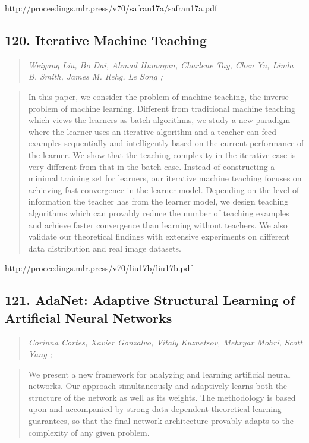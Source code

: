 \documentclass{article}
\begin{document}
\href{http://proceedings.mlr.press/v70/safran17a/safran17a.pdf}{http://proceedings.mlr.press/v70/safran17a/safran17a.pdf}

\subsection{120. Iterative Machine Teaching}

\begin{quote}
\footnotesize{\textit{Weiyang Liu, Bo Dai, Ahmad Humayun, Charlene Tay, Chen Yu, Linda B. Smith, James M. Rehg, Le Song ;}}

\end{quote}

\begin{quote}
    In this paper, we consider the problem of machine teaching, the inverse problem of machine learning. Different from traditional machine teaching which views the learners as batch algorithms, we study a new paradigm where the learner uses an iterative algorithm and a teacher can feed examples sequentially and intelligently based on the current performance of the learner. We show that the teaching complexity in the iterative case is very different from that in the batch case. Instead of constructing a minimal training set for learners, our iterative machine teaching focuses on achieving fast convergence in the learner model. Depending on the level of information the teacher has from the learner model, we design teaching algorithms which can provably reduce the number of teaching examples and achieve faster convergence than learning without teachers. We also validate our theoretical findings with extensive experiments on different data distribution and real image datasets.  
\end{quote}

\href{http://proceedings.mlr.press/v70/liu17b/liu17b.pdf}{http://proceedings.mlr.press/v70/liu17b/liu17b.pdf}

\subsection{121. AdaNet: Adaptive Structural Learning of Artificial Neural Networks}

\begin{quote}
\footnotesize{\textit{Corinna Cortes, Xavier Gonzalvo, Vitaly Kuznetsov, Mehryar Mohri, Scott Yang ;}}

\end{quote}

\begin{quote}
    We present a new framework for analyzing and learning artificial neural networks. Our approach simultaneously and adaptively learns both the structure of the network as well as its weights. The methodology is based upon and accompanied by strong data-dependent theoretical learning guarantees, so that the final network architecture provably adapts to the complexity of any given problem.  
\end{quote}
\end{document}
